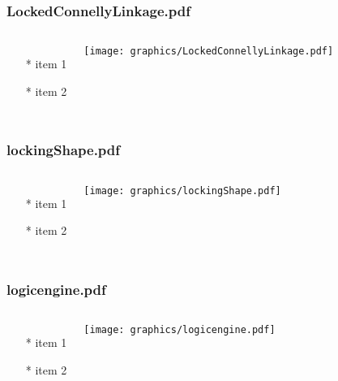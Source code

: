 \documentclass{beamer}
\begin{document}
\begin{frame} \frametitle{LockedConnellyLinkage.pdf}
    \begin{columns}[c]
        \begin{itemize}
            \item[*] item 1
            \item[*] item 2
        \end{itemize}
        \begin{minipage}{\linewidth}
            \begin{center}
            \texttt{[image: graphics/LockedConnellyLinkage.pdf]}
            \label{gfx:LockedConnellyLinkage.pdf}
            \end{center}
        \end{minipage}
    \end{columns}
\end{frame}
\begin{frame} \frametitle{lockingShape.pdf}
    \begin{columns}[c]
        \begin{itemize}
            \item[*] item 1
            \item[*] item 2
        \end{itemize}
        \begin{minipage}{\linewidth}
            \begin{center}
            \texttt{[image: graphics/lockingShape.pdf]}
            \label{gfx:lockingShape.pdf}
            \end{center}
        \end{minipage}
    \end{columns}
\end{frame}
\begin{frame} \frametitle{logicengine.pdf}
    \begin{columns}[c]
        \begin{itemize}
            \item[*] item 1
            \item[*] item 2
        \end{itemize}
        \begin{minipage}{\linewidth}
            \begin{center}
            \texttt{[image: graphics/logicengine.pdf]}
            \label{gfx:logicengine.pdf}
            \end{center}
        \end{minipage}
    \end{columns}
\end{frame}
\end{document}
